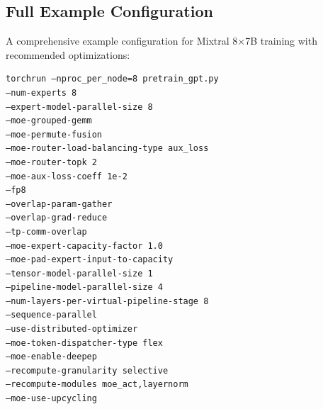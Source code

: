 
\subsection{Full Example Configuration}
A comprehensive example configuration for Mixtral 8×7B training with recommended optimizations:

\begin{verbatim}
torchrun –nproc_per_node=8 pretrain_gpt.py 
–num-experts 8 
–expert-model-parallel-size 8 
–moe-grouped-gemm 
–moe-permute-fusion 
–moe-router-load-balancing-type aux_loss 
–moe-router-topk 2 
–moe-aux-loss-coeff 1e-2 
–fp8 
–overlap-param-gather 
–overlap-grad-reduce 
–tp-comm-overlap 
–moe-expert-capacity-factor 1.0 
–moe-pad-expert-input-to-capacity 
–tensor-model-parallel-size 1 
–pipeline-model-parallel-size 4 
–num-layers-per-virtual-pipeline-stage 8 
–sequence-parallel 
–use-distributed-optimizer 
–moe-token-dispatcher-type flex 
–moe-enable-deepep 
–recompute-granularity selective 
–recompute-modules moe_act,layernorm 
–moe-use-upcycling
\end{verbatim}
  